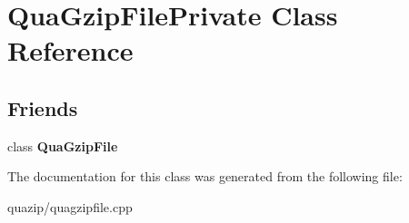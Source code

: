 \section{QuaGzipFilePrivate Class Reference}
\label{classQuaGzipFilePrivate}
\subsection*{Friends}
\begin{DoxyCompactItemize}
\item 
class {\bf QuaGzipFile}\label{classQuaGzipFilePrivate_a2baff888457927e38aa5384cd15474c3}

\end{DoxyCompactItemize}


The documentation for this class was generated from the following file:\begin{DoxyCompactItemize}
\item 
quazip/quagzipfile.cpp\end{DoxyCompactItemize}
